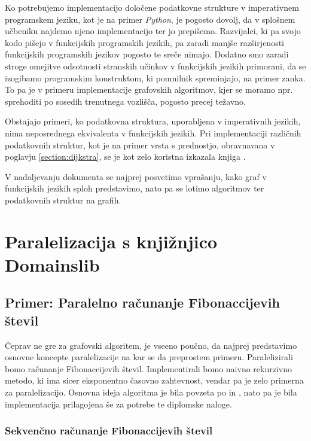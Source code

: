 \documentclass[mat1, tisk]{fmfdelo}
\begin{document}
Ko potrebujemo implementacijo določene podatkovne strukture v imperativnem programskem jeziku, kot je na primer
\textit{Python}, je pogosto dovolj, da v splošnem učbeniku najdemo njeno implementacijo ter jo prepišemo.
Razvijalci, ki pa svojo kodo pišejo v funkcijskih programskih jezikih, pa zaradi manjše
razširjenosti funkcijskih programskih jezikov pogosto te sreče nimajo.
Dodatno smo zaradi stroge omejitve odsotnosti stranskih učinkov v funkcijskih jezikih primorani, da se izogibamo
programskim konstruktom, ki pomnilnik spreminjajo, na primer zanka. To pa je v primeru implementacije grafovskih
algoritmov, kjer se moramo npr. sprehoditi po sosedih trenutnega vozlišča, pogosto precej težavno.

Obstajajo primeri, ko podatkovna struktura, uporabljena v imperativnih jezikih, nima neposrednega ekvivalenta v funkcijskih jezikih.
Pri implementaciji različnih podatkovnih struktur, kot je na primer vrsta s prednostjo, obravnavana v poglavju \ref{section:dijkstra},
se je kot zelo koristna izkazala knjiga \cite{okasaki1996}.

V nadaljevanju dokumenta se najprej posvetimo vprašanju, kako graf v funkcijskih jezikih sploh predstavimo, 
nato pa se lotimo algoritmov ter podatkovnih struktur na grafih.


\section{Paralelizacija s knjižnjico Domainslib}


\subsection{Primer: Paralelno računanje Fibonaccijevih števil}

Čeprav ne gre za grafovski algoritem, je vseeno poučno, da najprej predstavimo osnovne koncepte
paralelizacije na kar se da preprostem primeru. Paralelizirali bomo računanje Fibonaccijevih števil.
Implementirali bomo naivno rekurzivno metodo, ki ima sicer eksponentno časovno zahtevnost, vendar pa je zelo primerna za paralelizacijo.
Osnovna ideja algoritma je bila povzeta po \cite{parallel_fib_computation} in \cite{multicore_ocaml_article},
nato pa je bila implementacija prilagojena še za potrebe te diplomske naloge. 

\subsubsection{Sekvenčno računanje Fibonaccijevih števil}
\end{document}
